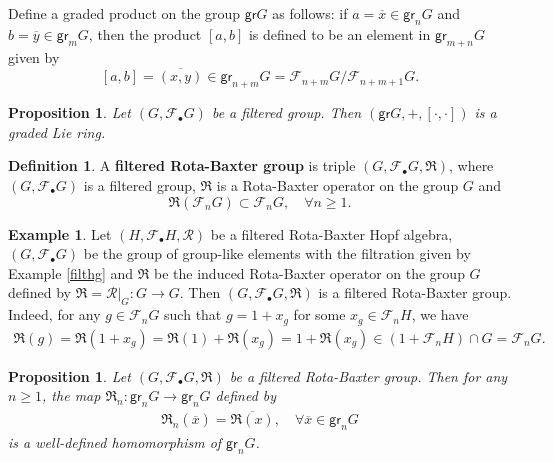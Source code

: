 \documentclass[12pt]{amsart}
\newtheorem{pro}[thm]{Proposition}
\theoremstyle{definition}   %
\newtheorem{defi}[thm]{Definition}
\newtheorem{ex}[thm]{Example}
\newcommand{\gr}{\mathsf{gr}}
\newcommand{\huaR}{\mathcal{R}}
\newcommand{\huaF}{\mathcal{F}}
\newcommand{\frkR}{\mathfrak R}
\begin{document}
Define a graded product on the group $\gr G$ as follows: if $a=\overline{x}\in \gr_nG$ and $b=\overline{y}\in \gr_mG$, then the product $[a,b]$ is defined to be an element in $\gr_{m+n}G$ given by
\begin{equation}\label{prod}
    [a,b]=\overline{(x,y)}\in \gr_{n+m}G=\huaF_{n+m}G/\huaF_{n+m+1}G.
\end{equation}

\begin{pro}\cite{Ser}
 Let $(G,\huaF_{\bullet}G)$ be a filtered group. Then $(\gr G,+,[\cdot,\cdot])$ is a graded Lie ring.
\end{pro}




\begin{defi}
    A \textbf{filtered Rota-Baxter group} is triple $(G,\huaF_{\bullet}G,\frkR)$, where $(G,\huaF_{\bullet}G)$ is a filtered group, $\frkR$ is a Rota-Baxter operator on the group $G$ and
    $$
    \frkR(\huaF_nG)\subset \huaF_n G,\quad \forall n\geq 1.
    $$

\end{defi}



\begin{ex}
Let $(H,\huaF_{\bullet}H,\huaR)$ be a filtered Rota-Baxter Hopf algebra, $(G,\huaF_{\bullet}G)$ be the group of group-like elements with the filtration given by Example \ref{filthg} and $\frkR$ be the induced Rota-Baxter operator on the group $G$ defined by   $\frkR=\huaR|_G:G\rightarrow G$. Then $(G,\huaF_{\bullet}G,\frkR)$ is a filtered Rota-Baxter group.
Indeed, for any $g\in \huaF_nG$ such that $g=1+x_g$ for some $x_g\in \huaF_nH$, we have
\begin{eqnarray*}
\frkR(g)=\frkR(1+x_g)=\frkR(1)+\frkR(x_g)=1+\frkR(x_g)\in (1+\huaF_nH)\cap G=\huaF_nG.
\end{eqnarray*}
\end{ex}

\begin{pro}
    Let $(G,\huaF_{\bullet}G,\frkR)$ be a filtered Rota-Baxter group. Then for any $n\geq 1$, the map $\frkR_n:\gr_nG\rightarrow \gr_nG$ defined by
\begin{eqnarray*}
    \frkR_n(\overline{x})=\overline{\frkR(x)},\quad \forall \overline{x}\in \gr_nG
\end{eqnarray*}
    is a well-defined homomorphism of $\gr_nG$.
\end{pro}
\end{document}
